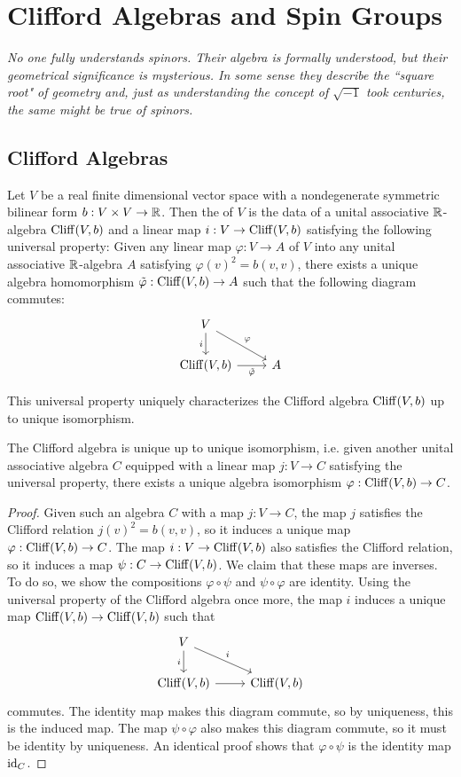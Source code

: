
\chapter{Clifford Algebras and Spin Groups}
%
\subsectionend
$ $\\
\emph{No one fully understands spinors. Their algebra is formally understood,
but their geometrical significance is mysterious. In some sense they describe
the ``square root" of geometry and, just as understanding the concept of
$\sqrt{-1}$ took centuries, the same might be true of spinors.} \\
%
\subsectionend 
%
\section{Clifford Algebras}
%
\begin{defn}
Let $V$ be a real finite dimensional vector space with a nondegenerate
symmetric bilinear form $b : V \times V \to \mathbb{R}$. Then the 
of $V$ is the data of a unital associative $\mathbb{R}$-algebra $\operatorname{Cliff}(V,b)$ and a linear
map $i : V \to \operatorname{Cliff}(V,b)$ satisfying the following universal property:
Given any linear map $\varphi : V \to A$ of $V$ into any unital associative
$\mathbb{R}$-algebra $A$ satisfying $\varphi(v)^2 = b(v,v)$, there exists a unique algebra
homomorphism $\tilde{\varphi}: \operatorname{Cliff}(V,b) \to A$ such that the following
diagram commutes:
%
\[\begin{tikzcd}
V \ar[dr, "\varphi"] \ar[d, "i"'] \\
\Cliff(V,b) \ar[r, "\tilde{\varphi}"'] & A
\end{tikzcd}\]
\end{defn}
%
This universal property uniquely characterizes the Clifford algebra $\operatorname{Cliff}(V,b)$
up to unique isomorphism.
%
\begin{thm}
The Clifford algebra is unique up to unique isomorphism, i.e. given
another unital associative algebra $C$ equipped with a linear map $j : V \to C$
satisfying the universal property, there exists a unique algebra isomorphism
$\varphi : \operatorname{Cliff}(V,b) \to C$.
\end{thm}
%
\begin{proof}
Given such an algebra $C$ with a map $j: V \to C$, the map $j$
satisfies the Clifford relation $j(v)^2 = b(v,v)$, so it induces a unique map
$\varphi : \operatorname{Cliff}(V,b) \to C$. The map $i : V \to \operatorname{Cliff}(V,b)$ also
satisfies the Clifford relation, so it induces a map $\psi : C \to \operatorname{Cliff}(V,b)$.
We claim that these maps are inverses. To do so, we show the compositions
$\varphi \circ \psi$ and $\psi \circ \varphi$ are identity. Using the
universal property of the Clifford algebra once more, the map $i$ induces
a unique map $\operatorname{Cliff}(V,b) \to \operatorname{Cliff}(V,b)$ such that
\[\begin{tikzcd}
V \ar[dr, "i"] \ar[d, "i"'] \\
\Cliff(V,b) \ar[r] & \Cliff(V,b)
\end{tikzcd}\]
commutes. The identity map makes this diagram commute, so by uniqueness, this is
the induced map. The map $\psi \circ \varphi$ also makes this diagram commute,
so it must be identity by uniqueness. An identical proof shows that
$\varphi \circ \psi$ is the identity map $\operatorname{id}_C$.
\end{proof}
